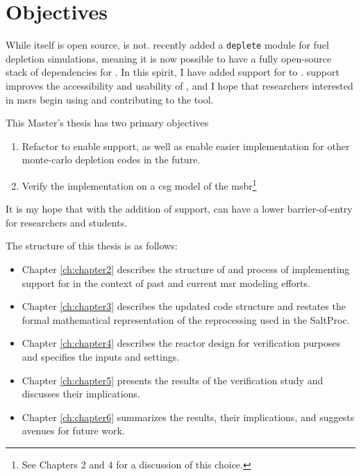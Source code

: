 \section{Objectives}%
\label{sec:objectives}

While \SaltProc itself is open source, \SerpentTWO is not. \OpenMC recently
added a \verb.deplete. module for fuel depletion simulations, meaning it is now
possible to have a fully open-source stack of dependencies for \SaltProc.
In this spirit, I have added support for \OpenMC to \SaltProc. \OpenMC support improves
the accessibility and usability of \SaltProc, and I hope that researchers
interested in \Gls{msr}s begin using and contributing to the tool.

This Master's thesis has two primary objectives
\begin{enumerate}
    \item Refactor \SaltProc to enable \OpenMC support, as well as enable
        easier implementation for other monte-carlo depletion codes in the
        future. 
    \item Verify the implementation on a \Gls{csg} model of the \Gls{msbr}\footnote{See
        Chapters 2 and 4 for a discussion of this choice.}
\end{enumerate}

It is my hope that with the addition of \OpenMC support, \SaltProc can have a
lower barrier-of-entry for researchers and students. 

The structure of this thesis is as follows:
\begin{itemize}
    \item Chapter \ref{ch:chapter2} describes the structure of \SaltProc and process of
        implementing support for \OpenMC in the context of past and current
        \Gls{msr} modeling efforts.
    \item Chapter \ref{ch:chapter3} describes the updated code structure and restates the
        formal mathematical representation of the reprocessing used in the
        SaltProc.
    \item Chapter \ref{ch:chapter4} describes the reactor design for verification purposes and
        specifies the inputs and settings.
    \item Chapter \ref{ch:chapter5} presents the results of the verification study and
        discusses their implications.
    \item Chapter \ref{ch:chapter6} summarizes the results, their implications, and suggests
        avenues for future work.
\end{itemize}

